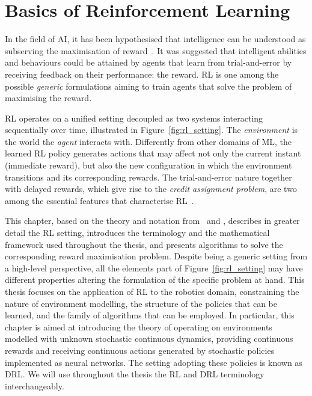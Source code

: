 \acresetall
\chapter{Basics of Reinforcement Learning}
\label{ch:reinforcement_learning}

In the field of \ac{AI}, it has been hypothesised that intelligence can be understood as subserving the maximisation of reward~\parencite{silver_reward_2021}.
It was suggested that intelligent abilities and behaviours could be attained by agents that learn from trial-and-error by receiving feedback on their performance: the reward.
\ac{RL} is one among the possible \emph{generic} formulations aiming to train agents that solve the problem of maximising the reward.

\acl{RL} operates on a unified setting decoupled as two systems interacting sequentially over time, illustrated in Figure~\ref{fig:rl_setting}.
The \emph{environment} is the world the \emph{agent} interacts with.
Differently from other domains of \acl{ML}, the learned \ac{RL} policy generates actions that may affect not only the current instant (immediate reward), but also the new configuration in which the environment transitions and its corresponding rewards.
The trial-and-error nature together with delayed rewards, which give rise to the \emph{credit assignment problem}, are two among the essential features that characterise \acs{RL}~\parencite{sutton_reinforcement_2018}.

This chapter, based on the theory and notation from~\textcite{achiam_spinning_2018} and \textcite{dong_deep_2020}, describes in greater detail the \acl{RL} setting, introduces the terminology and the mathematical framework used throughout the thesis, and presents algorithms to solve the corresponding reward maximisation problem.
Despite being a generic setting from a high-level perspective, all the elements part of Figure~\ref{fig:rl_setting} may have different properties altering the formulation of the specific problem at hand.
This thesis focuses on the application of \ac{RL} to the robotics domain, constraining the nature of environment modelling, the structure of the policies that can be learned, and the family of algorithms that can be employed.
In particular, this chapter is aimed at introducing the theory of operating on environments modelled with unknown stochastic continuous dynamics, providing continuous rewards and receiving continuous actions generated by stochastic policies implemented as neural networks.
The setting adopting these policies is known as \ac{DRL}.
We will use throughout the thesis the \ac{RL} and \ac{DRL} terminology interchangeably.

